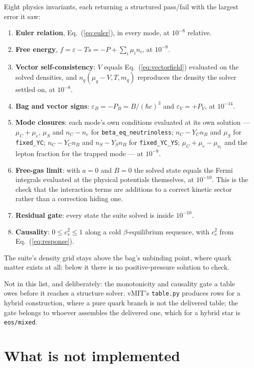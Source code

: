 \documentclass[aps,prc,onecolumn,superscriptaddress,nofootinbib,10pt]{revtex4-2}
\newcommand{\nB}{n_B}
\newcommand{\nC}{n_C}
\newcommand{\nS}{n_S}
\newcommand{\muC}{\mu_C}
\newcommand{\muS}{\mu_S}
\newcommand{\munue}{\mu_{\nu_e}}
\newcommand{\hc}{(\hbar c)^3}
\begin{document}
Eight physics invariants, each returning a structured pass/fail with the
largest error it saw:
%
\begin{enumerate}
\item \textbf{Euler relation}, Eq.~(\ref{eq:euler}), in every mode, at
      $10^{-8}$ relative.
\item \textbf{Free energy}, $f = \varepsilon - Ts = -P + \sum_i \mu_i n_i$, at
      $10^{-8}$.
\item \textbf{Vector self-consistency}: $V$ equals
      Eq.~(\ref{eq:vectorfield}) evaluated on the solved densities, and
      $n_q(\mu_q - V, T, m_q)$ reproduces the density the solver settled on,
      at $10^{-8}$.
\item \textbf{Bag and vector signs}: $\varepsilon_B = -P_B = B/\hc$ and
      $\varepsilon_V = +P_V$, at $10^{-14}$.
\item \textbf{Mode closures}: each mode's own conditions evaluated at its own
      solution --- $\muC + \mu_e$, $\muS$ and $\nC - n_e$ for
      \texttt{beta\_eq\_neutrinoless}; $\nC - Y_C\nB$ and $\muS$ for
      \texttt{fixed\_YC}; $\nC - Y_C\nB$ and $\nS - Y_S\nB$ for
      \texttt{fixed\_YC\_YS}; $\muC + \mu_e - \munue$ and the lepton fraction
      for the trapped mode --- at $10^{-8}$.
\item \textbf{Free-gas limit}: with $a = 0$ and $B = 0$ the solved state
      equals the Fermi integrals evaluated at the physical potentials
      themselves, at $10^{-10}$. This is the check that the interaction terms
      are additions to a correct kinetic sector rather than a correction
      hiding one.
\item \textbf{Residual gate}: every state the suite solved is inside
      $10^{-10}$.
\item \textbf{Causality}: $0 \le c_s^2 \le 1$ along a cold $\beta$-equilibrium
      sequence, with $c_s^2$ from Eq.~(\ref{eq:response}).
\end{enumerate}
%
The suite's density grid stays above the bag's unbinding point, where quark
matter exists at all: below it there is no positive-pressure solution to
check.

Not in this list, and deliberately: the monotonicity and causality gate a
table owes before it reaches a structure solver. vMIT's \texttt{table.py}
produces rows for a hybrid construction, where a pure quark branch is not the
delivered table; the gate belongs to whoever assembles the delivered one,
which for a hybrid star is \texttt{eos/mixed}.

\section{What is not implemented}
\label{sec:deferred}
\end{document}
